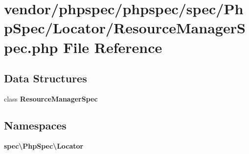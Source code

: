 \section{vendor/phpspec/phpspec/spec/\+Php\+Spec/\+Locator/\+Resource\+Manager\+Spec.php File Reference}
\label{_resource_manager_spec_8php}
\subsection*{Data Structures}
\begin{DoxyCompactItemize}
\item 
class {\bf Resource\+Manager\+Spec}
\end{DoxyCompactItemize}
\subsection*{Namespaces}
\begin{DoxyCompactItemize}
\item 
 {\bf spec\textbackslash{}\+Php\+Spec\textbackslash{}\+Locator}
\end{DoxyCompactItemize}
